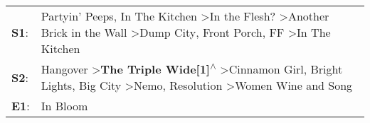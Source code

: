 \begin{supertabular}{p{0.03\textwidth}p{0.92\textwidth}}
 \textbf{S1}:  &  Partyin' Peeps\textsuperscript{}, \enspace In The Kitchen\textsuperscript{} \textgreater \enspace In the Flesh?\textsuperscript{} \textgreater \enspace Another Brick in the Wall\textsuperscript{} \textgreater \enspace Dump City\textsuperscript{}, \enspace Front Porch\textsuperscript{}, \enspace FF\textsuperscript{} \textgreater \enspace In The Kitchen\textsuperscript{}  \enspace  \\
 \textbf{S2}:  &                     Hangover\textsuperscript{} \textgreater \enspace \textbf{The Triple Wide[1]\textsuperscript{$\wedge$}} \textgreater \enspace Cinnamon Girl\textsuperscript{}, \enspace Bright Lights, Big City\textsuperscript{} \textgreater \enspace Nemo\textsuperscript{}, \enspace Resolution\textsuperscript{} \textgreater \enspace Women Wine and Song\textsuperscript{}  \enspace  \\
 \textbf{E1}:  &                                                                                                                                                                                                                                                                                                                                                           In Bloom\textsuperscript{}  \enspace  \\
\end{supertabular}
